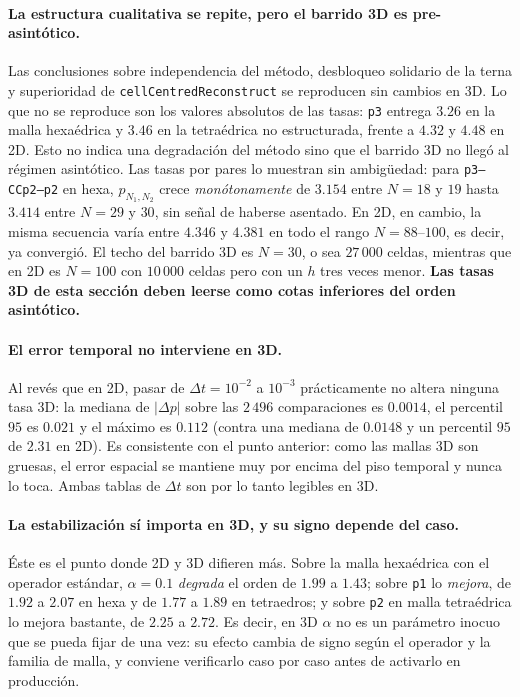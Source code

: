 \documentclass[11pt,a4paper]{article}
\newcommand{\code}[1]{\texttt{\small #1}}
\begin{document}
\paragraph{La estructura cualitativa se repite, pero el barrido 3D es pre-asintótico.}
Las conclusiones sobre independencia del método, desbloqueo solidario de la terna y superioridad
de \code{cellCentredReconstruct} se reproducen sin cambios en 3D. Lo que no se reproduce son los
valores absolutos de las tasas: \code{p3} entrega $3.26$ en la malla hexaédrica y $3.46$ en la
tetraédrica no estructurada, frente a $4.32$ y $4.48$ en 2D. Esto no indica una degradación del
método sino que el barrido 3D no llegó al régimen asintótico. Las tasas por pares lo muestran
sin ambigüedad: para \code{p3--CCp2--p2} en hexa, $p_{N_1,N_2}$ crece \emph{monótonamente} de
$3.154$ entre $N=18$ y $19$ hasta $3.414$ entre $N=29$ y $30$, sin señal de haberse asentado.
En 2D, en cambio, la misma secuencia varía entre $4.346$ y $4.381$ en todo el rango
$N=88$--$100$, es decir, ya convergió. El techo del barrido 3D es $N=30$, o sea $27\,000$
celdas, mientras que en 2D es $N=100$ con $10\,000$ celdas pero con un $h$ tres veces menor.
\textbf{Las tasas 3D de esta sección deben leerse como cotas inferiores del orden asintótico.}

\paragraph{El error temporal no interviene en 3D.}
Al revés que en 2D, pasar de $\Delta t=10^{-2}$ a $10^{-3}$ prácticamente no altera ninguna tasa
3D: la mediana de $|\Delta p|$ sobre las $2\,496$ comparaciones es $0.0014$, el percentil $95$ es
$0.021$ y el máximo es $0.112$ (contra una mediana de $0.0148$ y un percentil $95$ de $2.31$ en
2D). Es consistente con el punto anterior: como las mallas 3D son gruesas, el error espacial se
mantiene muy por encima del piso temporal y nunca lo toca. Ambas tablas de $\Delta t$ son por lo
tanto legibles en 3D.

\paragraph{La estabilización sí importa en 3D, y su signo depende del caso.}
Éste es el punto donde 2D y 3D difieren más. Sobre la malla hexaédrica con el operador estándar,
$\alpha=0.1$ \emph{degrada} el orden de $1.99$ a $1.43$; sobre \code{p1} lo \emph{mejora}, de
$1.92$ a $2.07$ en hexa y de $1.77$ a $1.89$ en tetraedros; y sobre \code{p2} en malla
tetraédrica lo mejora bastante, de $2.25$ a $2.72$. Es decir, en 3D $\alpha$ no es un parámetro
inocuo que se pueda fijar de una vez: su efecto cambia de signo según el operador y la familia
de malla, y conviene verificarlo caso por caso antes de activarlo en producción.
\end{document}

